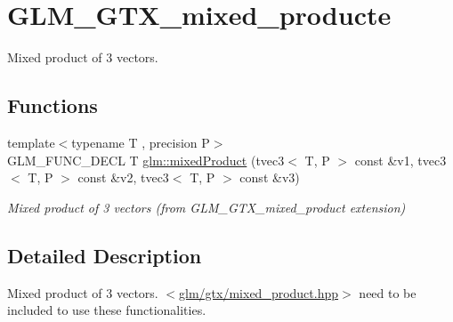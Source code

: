 \hypertarget{group__gtx__mixed__product}{\section{G\-L\-M\-\_\-\-G\-T\-X\-\_\-mixed\-\_\-producte}
\label{group__gtx__mixed__product}
}


Mixed product of 3 vectors.  


\subsection*{Functions}
\begin{DoxyCompactItemize}
\item 
\hypertarget{group__gtx__mixed__product_gaaee4cf80d69cb86de80f12af88b3c3af}{{\footnotesize template$<$typename T , precision P$>$ }\\G\-L\-M\-\_\-\-F\-U\-N\-C\-\_\-\-D\-E\-C\-L T \hyperlink{group__gtx__mixed__product_gaaee4cf80d69cb86de80f12af88b3c3af}{glm\-::mixed\-Product} (tvec3$<$ T, P $>$ const \&v1, tvec3$<$ T, P $>$ const \&v2, tvec3$<$ T, P $>$ const \&v3)}\label{group__gtx__mixed__product_gaaee4cf80d69cb86de80f12af88b3c3af}

\begin{DoxyCompactList}\small\item\em Mixed product of 3 vectors (from G\-L\-M\-\_\-\-G\-T\-X\-\_\-mixed\-\_\-product extension) \end{DoxyCompactList}\end{DoxyCompactItemize}


\subsection{Detailed Description}
Mixed product of 3 vectors. $<$\hyperlink{mixed__product_8hpp}{glm/gtx/mixed\-\_\-product.\-hpp}$>$ need to be included to use these functionalities. 